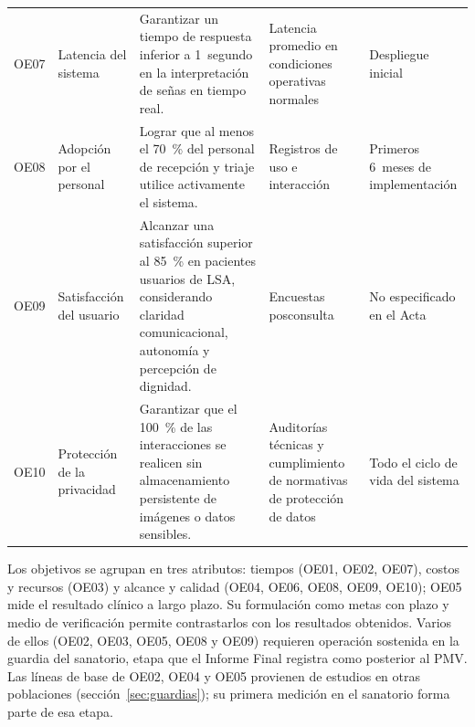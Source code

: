 {\begin{longtable}{@{}p{0.9cm}p{2.8cm}p{5.3cm}p{2.8cm}p{2.2cm}@{}}
OE07 & Latencia del sistema & Garantizar un tiempo de respuesta inferior a 1~segundo en la interpretación de señas en tiempo real. & Latencia promedio en condiciones operativas normales & Despliegue inicial \\
OE08 & Adopción por el personal & Lograr que al menos el 70~\% del personal de recepción y triaje utilice activamente el sistema. & Registros de uso e interacción & Primeros 6~meses de implementación \\
OE09 & Satisfacción del usuario & Alcanzar una satisfacción superior al 85~\% en pacientes usuarios de LSA, considerando claridad comunicacional, autonomía y percepción de dignidad. & Encuestas posconsulta & No especificado en el Acta \\
OE10 & Protección de la privacidad & Garantizar que el 100~\% de las interacciones se realicen sin almacenamiento persistente de imágenes o datos sensibles. & Auditorías técnicas y cumplimiento de normativas de protección de datos & Todo el ciclo de vida del sistema \\
\end{longtable}
}

Los objetivos se agrupan en tres atributos: tiempos (OE01, OE02, OE07), costos y recursos (OE03) y alcance y calidad (OE04, OE06, OE08, OE09, OE10); OE05 mide el resultado clínico a largo plazo. Su formulación como metas con plazo y medio de verificación permite contrastarlos con los resultados obtenidos. Varios de ellos (OE02, OE03, OE05, OE08 y OE09) requieren operación sostenida en la guardia del sanatorio, etapa que el Informe Final registra como posterior al PMV. Las líneas de base de OE02, OE04 y OE05 provienen de estudios en otras poblaciones (sección~\ref{sec:guardias}); su primera medición en el sanatorio forma parte de esa etapa.
